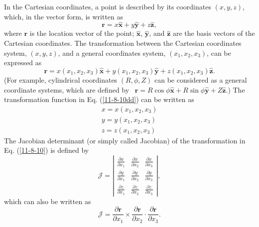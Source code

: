 \documentclass{article}
\begin{document}
In the Cartesian coordinates, a point is described by its coordinates $(x, y,
z)$, which, in the vector form, is written as
\begin{equation}
  \mathbf{r}= x \hat{\mathbf{x}} + y \hat{\mathbf{y}} + z \hat{\mathbf{z}},
\end{equation}
where $\mathbf{r}$ is the location vector of the point; $\hat{\mathbf{x}}$,
$\hat{\mathbf{y}}$, and $\hat{\mathbf{z}}$ are the basis vectors of the
Cartesian coordinates. The transformation between the Cartesian coordinates
system, $(x, y, z)$, and a general coordinates system, $(x_1, x_2, x_3)$, can
be expressed as
\begin{equation}
  \label{11-8-10dd} \mathbf{r}= x (x_1, x_2, x_3) \hat{\mathbf{x}} + y (x_1,
  x_2, x_3) \hat{\mathbf{y}} + z (x_1, x_2, x_3) \hat{\mathbf{z}} .
\end{equation}
(For example, cylindrical coordinates $(R, \phi, Z)$ can be considered as a
general coordinate systems, which are defined by \ $\mathbf{r}= R \cos \phi
\hat{\mathbf{x}} + R \sin \phi \hat{\mathbf{y}} + Z \hat{\mathbf{z}}$.) The
transformation function in Eq. (\ref{11-8-10dd}) can be written as
\begin{equation}
  \label{11-8-10} \begin{array}{l}
    x = x (x_1, x_2, x_3)\\
    y = y (x_1, x_2, x_3)\\
    z = z (x_1, x_2, x_3)
  \end{array}
\end{equation}
The Jacobian determinant (or simply called Jacobian) of the transformation in
Eq. (\ref{11-8-10}) is defined by
\begin{equation}
  \mathcal{J}= \left|\begin{array}{ccc}
    \frac{\partial x}{\partial x_1} & \frac{\partial x}{\partial x_2} &
    \frac{\partial x}{\partial x_3}\\
    \frac{\partial y}{\partial x_1} & \frac{\partial y}{\partial x_2} &
    \frac{\partial y}{\partial x_3}\\
    \frac{\partial z}{\partial x_1} & \frac{\partial z}{\partial x_2} &
    \frac{\partial z}{\partial x_3}
  \end{array}\right|,
\end{equation}
which can also be written as
\begin{equation}
  \label{10-21-p3} \mathcal{J}= \frac{\partial \mathbf{r}}{\partial x_1}
  \times \frac{\partial \mathbf{r}}{\partial x_2} \cdot \frac{\partial
  \mathbf{r}}{\partial x_3} .
\end{equation}
\end{document}
